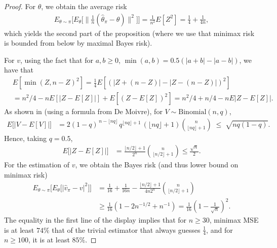 \documentclass[12pt,reqno]{amsart}
\begin{document}
\begin{proof}
    For $\theta$, we obtain the average risk
    \begin{align*}
        E_{\theta \sim \pi} \bigg[E_\theta \bigg[\bigg\| \tfrac{1}{n} (\hat{\theta}_\pi - \theta) \bigg\|^2\bigg]\bigg]
        = \frac{1}{n^2} E[Z^2]
        = \frac{1}{4} + \frac{1}{4 n},
    \end{align*}
    which yields the second part of the proposition (where we use that minimax risk is bounded from below by maximal Bayes risk).

    For $v$, using the fact that for $a,b \geq 0$, $\min(a,b) = 0.5 (|a+b| - |a-b|)$, we have that    
    \begin{align*}
        &E[\min(Z, n - Z)^2]
        =
        \frac{1}{4}
        E \left[\left(|Z + (n - Z)| - |Z - (n - Z)| \right)^2 \right]
        \\
        &= n^2 / 4  - n E [|Z - E[Z]|] + E[(Z - E[Z])^2]
        =
        n^2 / 4 + n / 4 - n E |Z - E[Z]|.
    \end{align*}
    As shown in \citet{berend2013sharp} (using a formula from De Moivre), for
    $V \sim \text{Binomial}(n,q)$,
    \begin{align*}
        E\big[\left|V-E[V]\right|\big]
        &=2(1-q)^{\,n-\lfloor nq\rfloor}\,q^{\lfloor nq\rfloor+1}\,(\lfloor nq\rfloor+1)
        \binom{n}{\lfloor nq\rfloor+1}
        \;\le\; \sqrt{nq(1-q)}.
    \end{align*}
    Hence, taking $q=0.5$,
    \begin{align*}
        E\big[\bigl|Z - E[Z]\bigr|\big]
        &=
        \frac{\lfloor n/2\rfloor+1}{2^{n}} \binom{n}{\lfloor n/2\rfloor+1}
        \le
        \frac{\sqrt{n}}{2}.
    \end{align*}
    For the estimation of $v$, we obtain the Bayes risk (and thus lower bound on minimax risk)
    \begin{align*}
        E_{\theta \sim \pi}\big[ E_\theta \big[ | \hat{v}_\pi - v |^2 \big]\big]
        &=
        \frac{1}{16}
        + \frac{1}{16 n}
        - \frac{\lfloor n/2\rfloor+1}{4 n 2^{n}} \binom{n}{\lfloor n/2\rfloor+1}
        \\
        &\geq
        \frac{1}{16} \left(1 - 2 n^{-1/2} + n^{-1}\right)
        = \frac{1}{16} \left(1 - \frac{1}{\sqrt{n}}\right)^2.
    \end{align*}
    The equality in the first line of the display implies that for $n\ge 30$, minimax MSE is at least $74\%$ that of the
    trivial estimator that always guesses $\tfrac{1}{4}$, and for $n\ge 100$, it is at least $85\%$.
\end{proof}
\end{document}
